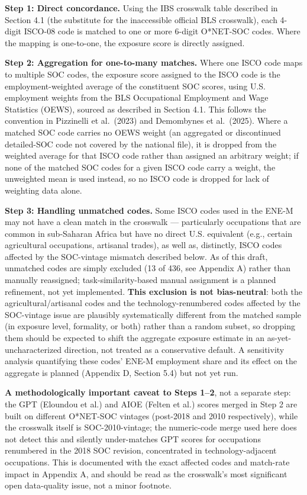 \documentclass[
  11pt,
]{article}
\begin{document}
\textbf{Step 1: Direct concordance.} Using the IBS crosswalk table
described in Section 4.1 (the substitute for the inaccessible official
BLS crosswalk), each 4-digit ISCO-08 code is matched to one or more
6-digit O*NET-SOC codes. Where the mapping is one-to-one, the exposure
score is directly assigned.

\textbf{Step 2: Aggregation for one-to-many matches.} Where one ISCO
code maps to multiple SOC codes, the exposure score assigned to the ISCO
code is the employment-weighted average of the constituent SOC scores,
using U.S. employment weights from the BLS Occupational Employment and
Wage Statistics (OEWS), sourced as described in Section 4.1. This
follows the convention in Pizzinelli et al.~(2023) and Demombynes et
al.~(2025). Where a matched SOC code carries no OEWS weight (an
aggregated or discontinued detailed-SOC code not covered by the national
file), it is dropped from the weighted average for that ISCO code rather
than assigned an arbitrary weight; if none of the matched SOC codes for
a given ISCO code carry a weight, the unweighted mean is used instead,
so no ISCO code is dropped for lack of weighting data alone.

\textbf{Step 3: Handling unmatched codes.} Some ISCO codes used in the
ENE-M may not have a clean match in the crosswalk --- particularly
occupations that are common in sub-Saharan Africa but have no direct
U.S. equivalent (e.g., certain agricultural occupations, artisanal
trades), as well as, distinctly, ISCO codes affected by the SOC-vintage
mismatch described below. As of this draft, unmatched codes are simply
excluded (13 of 436, see Appendix A) rather than manually reassigned;
task-similarity-based manual assignment is a planned refinement, not yet
implemented. \textbf{This exclusion is not bias-neutral}: both the
agricultural/artisanal codes and the technology-renumbered codes
affected by the SOC-vintage issue are plausibly systematically different
from the matched sample (in exposure level, formality, or both) rather
than a random subset, so dropping them should be expected to shift the
aggregate exposure estimate in an as-yet-uncharacterized direction, not
treated as a conservative default. A sensitivity analysis quantifying
these codes' ENE-M employment share and its effect on the aggregate is
planned (Appendix D, Section 5.4) but not yet run.

\textbf{A methodologically important caveat to Steps 1--2}, not a
separate step: the GPT (Eloundou et al.) and AIOE (Felten et al.) scores
merged in Step 2 are built on different O*NET-SOC vintages (post-2018
and 2010 respectively), while the crosswalk itself is SOC-2010-vintage;
the numeric-code merge used here does not detect this and silently
under-matches GPT scores for occupations renumbered in the 2018 SOC
revision, concentrated in technology-adjacent occupations. This is
documented with the exact affected codes and match-rate impact in
Appendix A, and should be read as the crosswalk's most significant open
data-quality issue, not a minor footnote.
\end{document}

